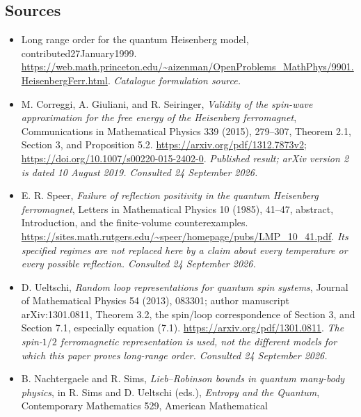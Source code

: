 \documentclass[11pt]{article}
\begin{document}
	\subsection{Sources}
	\begin{itemize}\raggedright
		\item[\textnormal{[S1]}]\hypertarget{source:statement:1}{} Long range order for the quantum Heisenberg model, contributed27January1999.
		\url{https://web.math.princeton.edu/~aizenman/OpenProblems_MathPhys/9901.HeisenbergFerr.html}.
		{\small\textit{Catalogue formulation source.}}
		\item[\textnormal{[E1]}]\hypertarget{extra:statement:1}{}
		M. Correggi, A. Giuliani, and R. Seiringer, \emph{Validity of the
			spin-wave approximation for the free energy of the Heisenberg
			ferromagnet}, Communications in Mathematical Physics 339 (2015),
		279--307, Theorem 2.1, Section 3, and Proposition 5.2.
		\url{https://arxiv.org/pdf/1312.7873v2};
		\url{https://doi.org/10.1007/s00220-015-2402-0}.
		{\small\textit{Published result; arXiv version 2 is dated 10 August 2019.
				Consulted 24 September 2026.}}
		\item[\textnormal{[E2]}]\hypertarget{extra:statement:2}{}
		E. R. Speer, \emph{Failure of reflection positivity in the quantum
			Heisenberg ferromagnet}, Letters in Mathematical Physics 10 (1985),
		41--47, abstract, Introduction, and the finite-volume counterexamples.
		\url{https://sites.math.rutgers.edu/~speer/homepage/pubs/LMP_10_41.pdf}.
		{\small\textit{Its specified regimes are not replaced here by a claim
				about every temperature or every possible reflection. Consulted
				24 September 2026.}}
		\item[\textnormal{[E3]}]\hypertarget{extra:statement:3}{}
		D. Ueltschi, \emph{Random loop representations for quantum spin systems},
		Journal of Mathematical Physics 54 (2013), 083301; author manuscript
		arXiv:1301.0811, Theorem 3.2, the spin/loop correspondence of Section 3,
		and Section 7.1, especially equation (7.1).
		\url{https://arxiv.org/pdf/1301.0811}.
		{\small\textit{The spin-$1/2$ ferromagnetic representation is used, not
				the different models for which this paper proves long-range order.
				Consulted 24 September 2026.}}
		\item[\textnormal{[E4]}]\hypertarget{extra:statement:4}{}
		B. Nachtergaele and R. Sims, \emph{Lieb--Robinson bounds in quantum
			many-body physics}, in R. Sims and D. Ueltschi (eds.), \emph{Entropy
			and the Quantum}, Contemporary Mathematics 529, American Mathematical

\end{itemize}
\end{document}
